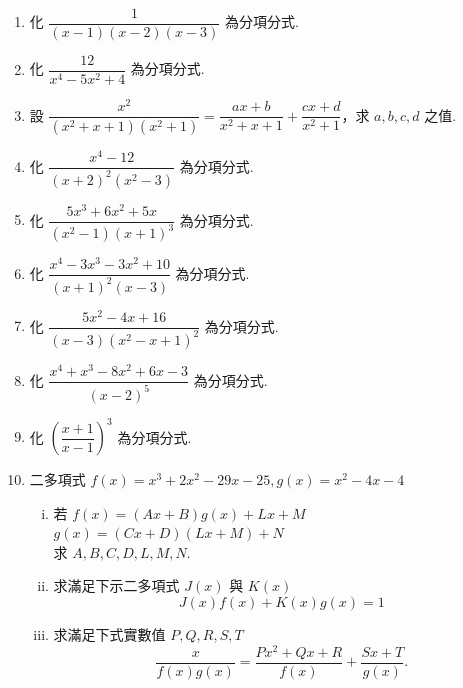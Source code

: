\begin{enumerate}[1.]
  \item 化 $\dfrac{1}{(x-1)(x-2)(x-3)}$ 為分項分式.

  \item 化 $\dfrac{12}{x^4-5x^2+4}$ 為分項分式.

  \item 設 $\dfrac{x^2}{(x^2+x+1)(x^2+1)} = \dfrac{ax+b}{x^2+x+1} + \dfrac{cx+d}{x^2+1}$，求 $a, b, c, d$ 之值.

  \item 化 $\dfrac{x^4-12}{(x+2)^2(x^2-3)}$ 為分項分式.

  \item 化 $\dfrac{5x^3+6x^2+5x}{(x^2-1)(x+1)^3}$ 為分項分式.

  \item 化 $\dfrac{x^4-3x^3-3x^2+10}{(x+1)^2(x-3)}$ 為分項分式.

  \item 化 $\dfrac{5x^2-4x+16}{(x-3)(x^2-x+1)^2}$ 為分項分式.

  \item 化 $\dfrac{x^4+x^3-8x^2+6x-3}{(x-2)^5}$ 為分項分式.

  \item 化 $\left(\dfrac{x+1}{x-1}\right)^3$ 為分項分式.

  \item 二多項式 $f(x) = x^3+2x^2-29x-25, g(x) = x^2-4x-4$
  \begin{enumerate}[(i)]
    \item 若 $f(x) = (Ax+B)g(x)+Lx+M$\\
    $g(x) = (Cx+D)(Lx+M)+N$\\
    求 $A, B, C, D, L, M, N$.
    \item 求滿足下示二多項式 $J(x)$ 與 $K(x)$
    \begin{equation*}
      J(x)f(x)+K(x)g(x) = 1
    \end{equation*}
    \item 求滿足下式實數值 $P, Q, R, S, T$
    \begin{equation*}
      \frac{x}{f(x)g(x)} = \frac{Px^2+Qx+R}{f(x)} + \frac{Sx+T}{g(x)}.
    \end{equation*}
  \end{enumerate}
\end{enumerate}
